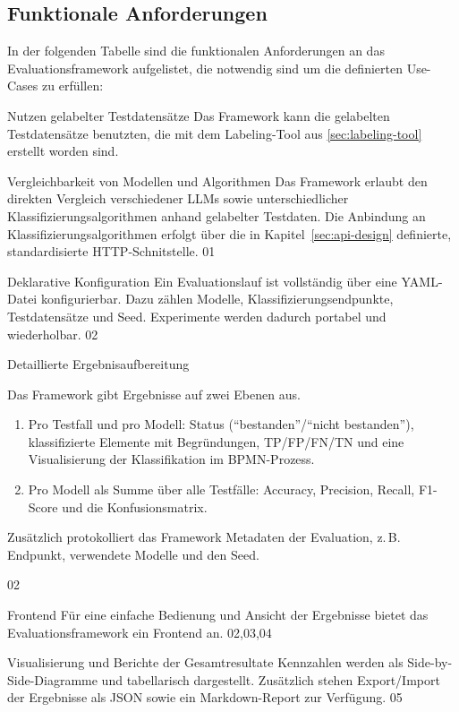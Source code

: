 \subsection*{Funktionale Anforderungen}

In der folgenden Tabelle sind die funktionalen Anforderungen an das Evaluationsframework aufgelistet, die notwendig sind um die definierten Use-Cases zu erfüllen:

\begin{center}
    {Nutzen gelabelter Testdatensätze}
    {Das Framework kann die gelabelten Testdatensätze benutzten, die mit dem Labeling-Tool aus \ref{sec:labeling-tool} erstellt worden sind.}
    {}
\end{center}

\begin{center}
    {Vergleichbarkeit von Modellen und Algorithmen}
    {Das Framework erlaubt den direkten Vergleich verschiedener \acp{LLM} sowie unterschiedlicher Klassifizierungsalgorithmen anhand gelabelter Testdaten. Die Anbindung an Klassifizierungsalgorithmen erfolgt über die in Kapitel~\ref{sec:api-design} definierte, standardisierte HTTP-Schnitstelle.}
    {01}
\end{center}

\begin{center}
    {Deklarative Konfiguration}
    {Ein Evaluationslauf ist vollständig über eine YAML-Datei konfigurierbar. Dazu zählen Modelle, Klassifizierungsendpunkte, Testdatensätze und Seed. Experimente werden dadurch portabel und wiederholbar.}
    {02}
\end{center}

\begin{center}
    {Detaillierte Ergebnisaufbereitung}
    {
    Das Framework gibt Ergebnisse auf zwei Ebenen aus.
    \begin{enumerate}
        \item Pro Testfall und pro Modell: Status (\enquote{bestanden}/\enquote{nicht bestanden}), klassifizierte Elemente mit Begründungen, \ac{TP}/\ac{FP}/\ac{FN}/\ac{TN} und eine Visualisierung der Klassifikation im \ac{BPMN}-Prozess.
        \item Pro Modell als Summe über alle Testfälle: Accuracy, Precision, Recall, F1-Score und die Konfusionsmatrix.
    \end{enumerate}
    Zusätzlich protokolliert das Framework Metadaten der Evaluation, z.\,B. Endpunkt, verwendete Modelle und den Seed.
    }
    {02}
\end{center}

\begin{center}
    {Frontend}
    {Für eine einfache Bedienung und Ansicht der Ergebnisse bietet das Evaluationsframework ein Frontend an.}
    {02,03,04}
\end{center}

\begin{center}
    {Visualisierung und Berichte der Gesamtresultate}
    {Kennzahlen werden als Side-by-Side-Diagramme und tabellarisch dargestellt. Zusätzlich stehen Export/Import der Ergebnisse als JSON sowie ein Markdown-Report zur Verfügung.}
    {05}
\end{center}